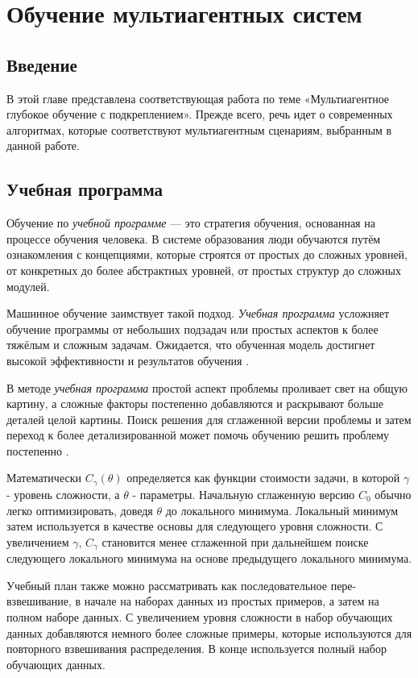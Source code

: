 \chapter{Обучение мультиагентных систем} \label{ch2}

\section{Введение} \label{ch2:intro}

В этой главе представлена соответствующая работа по теме «Мультиагентное глубокое обучение с подкреплением». Прежде всего, речь идет о современных алгоритмах, которые соответствуют мультиагентным сценариям, выбранным в данной работе.




\section{Учебная программа}

Обучение по \textit{учебной программе} — это стратегия обучения, основанная на процессе обучения человека. В системе образования люди обучаются путём ознакомления с концепциями, которые строятся от простых до сложных уровней, от конкретных до более абстрактных уровней, от простых структур до сложных модулей.

Машинное обучение заимствует такой подход. \textit{Учебная программа} усложняет обучение программы от небольших подзадач или простых аспектов к более тяжёлым и сложным задачам. Ожидается, что обученная модель достигнет высокой эффективности и результатов обучения \cite{10.5555/3171837.3172051}.

В методе \textit{учебная программа} простой аспект проблемы проливает свет на общую картину, а сложные факторы постепенно добавляются и раскрывают больше деталей целой картины. Поиск решения для сглаженной версии проблемы и затем переход к более детализированной может помочь обучению решить проблему постепенно \cite{graves2017automated}.

Математически $C_\gamma (\theta)$ определяется как функции стоимости задачи, в которой $\gamma$ - уровень сложности, а $\theta$ - параметры. Начальную сглаженную версию $C_0$ обычно легко оптимизировать, доведя $\theta$ до локального минимума. Локальный минимум затем используется в качестве основы для следующего уровня сложности. С увеличением $\gamma$, $C_\gamma$ становится менее сглаженной при дальнейшем поиске следующего локального минимума на основе предыдущего локального минимума. \cite{10.1145/1553374.1553380}

Учебный план также можно рассматривать как последовательное пере-взвешивание, в начале на наборах данных из простых примеров, а затем на полном наборе данных. С увеличением уровня сложности в набор обучающих данных добавляются немного более сложные примеры, которые используются для повторного взвешивания распределения. В конце используется полный набор обучающих данных. \cite{10.1145/1553374.1553380}

\newpage %
